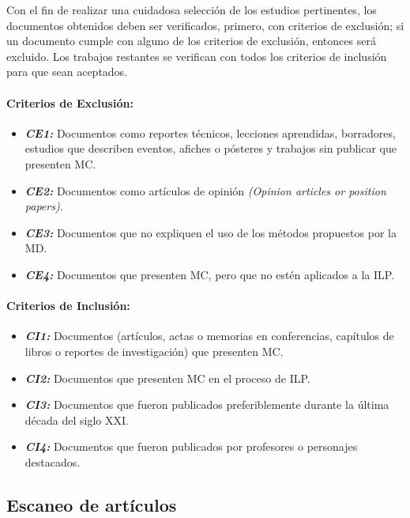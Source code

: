 Con el fin de realizar una cuidadosa selección de los estudios pertinentes, los documentos obtenidos deben ser verificados, primero, con criterios de exclusión; si un documento cumple con alguno de los criterios de exclusión, entonces será excluido. Los trabajos restantes se verifican con todos los criterios de inclusión para que sean aceptados.


\paragraph {Criterios de Exclusión:}
\begin{itemize}
\item \textbf{\textit{CE1: }} Documentos como reportes técnicos, lecciones aprendidas, borradores, estudios que describen eventos, afiches o pósteres y trabajos sin publicar que presenten MC.
\item \textbf{\textit{CE2: }} Documentos como artículos de opinión \textit{(Opinion articles or position papers)}.
\item \textbf{\textit{CE3: }} Documentos que no expliquen el uso de los métodos propuestos por la MD.
\item \textbf{\textit{CE4: }} Documentos que presenten MC, pero que no estén aplicados a la ILP.
\end{itemize}

\paragraph {Criterios de Inclusión:}
\begin{itemize}
	\item \textbf{\textit{CI1: }} Documentos (artículos, actas o memorias en conferencias, capítulos de libros o reportes de investigación) que presenten MC.
	\item \textbf{\textit{CI2: }} Documentos que presenten MC en el proceso de ILP.
	\item \textbf{\textit{CI3: }} Documentos que fueron publicados preferiblemente durante la última década del siglo XXI. 
	\item \textbf{\textit{CI4: }} Documentos que fueron publicados por profesores o personajes destacados.
\end{itemize}

\subsection{Escaneo de artículos}\label{escaneodepapers}

